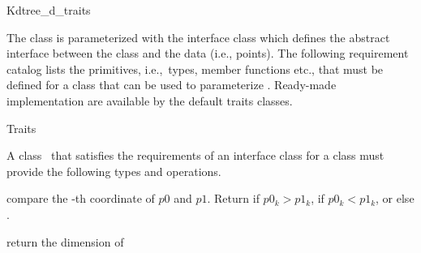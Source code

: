 \begin{ccRefConcept}{Kdtree_d_traits}

The   class is  parameterized with the
interface class  which defines the abstract interface
between the  class and the data (i.e., points). The following
requirement catalog lists the primitives, i.e.,~types, member functions
etc., that must be defined for a class that can be used to
parameterize \kdts. Ready-made implementation are available
by the  default traits classes.

\ccTwo{}{\hspace*{7.1cm}}


\begin{ccClass} {Traits}


    \ccDefinition
    A class \ccClassName\ that satisfies the requirements of an
    interface class for a  class must provide the
    following types and operations. 
  
    \ccTypes
    

    \ccOperations

     {compare the -th coordinate
       of $p0$ and $p1$.  Return  if $p0_k >
       p1_k$,  if $p0_k < p1_k$, or else
       .  }


    {return the dimension of }
\end{ccClass}
\end{ccRefConcept}

